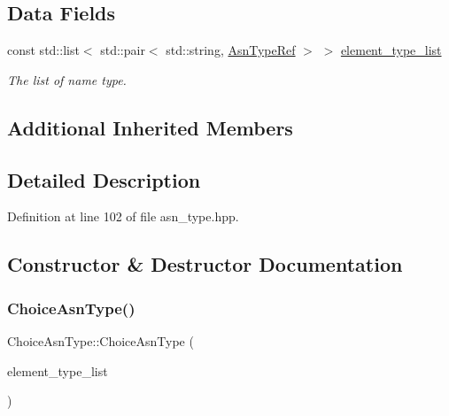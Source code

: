 \subsection*{Data Fields}
\begin{DoxyCompactItemize}
\item 
const std\+::list$<$ std\+::pair$<$ std\+::string, \hyperlink{asn__type_8hpp_a456d7cf50c15d087cc0428ae80834b35}{Asn\+Type\+Ref} $>$ $>$ \hyperlink{classChoiceAsnType_aa7f41981d0f8263299a5c829e0737981}{element\+\_\+type\+\_\+list}
\begin{DoxyCompactList}\small\item\em The list of name type. \end{DoxyCompactList}\end{DoxyCompactItemize}
\subsection*{Additional Inherited Members}


\subsection{Detailed Description}


Definition at line 102 of file asn\+\_\+type.\+hpp.



\subsection{Constructor \& Destructor Documentation}
\mbox{\label{classChoiceAsnType_a15e9e237156a15a4feac6a9003fe298a}} 
\subsubsection{\texorpdfstring{Choice\+Asn\+Type()}{ChoiceAsnType()}}
{\footnotesize\ttfamily Choice\+Asn\+Type\+::\+Choice\+Asn\+Type (\begin{DoxyParamCaption}\item[{std\+::list$<$ std\+::pair$<$ std\+::string, \hyperlink{asn__type_8hpp_a456d7cf50c15d087cc0428ae80834b35}{Asn\+Type\+Ref} $>$$>$}]{element\+\_\+type\+\_\+list }\end{DoxyParamCaption})\hspace{0.3cm}{\ttfamily [explicit]}}



